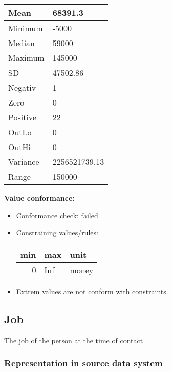 \documentclass[
]{article}
\providecommand{\tightlist}{%
  \setlength{\itemsep}{0pt}\setlength{\parskip}{0pt}}
\begin{document}
\begin{table}[H]
\centering
\begin{tabular}{l|l}
\hline
Mean & 68391.3\\
\hline
Minimum & -5000\\
\hline
Median & 59000\\
\hline
Maximum & 145000\\
\hline
SD & 47502.86\\
\hline
Negativ & 1\\
\hline
Zero & 0\\
\hline
Positive & 22\\
\hline
OutLo & 0\\
\hline
OutHi & 0\\
\hline
Variance & 2256521739.13\\
\hline
Range & 150000\\
\hline
\end{tabular}
\end{table}

\textbf{Value conformance:}

\begin{itemize}
\tightlist
\item
  Conformance check: failed
\item
  Constraining values/rules:

  \begin{table}[H]
  \centering
  \begin{tabular}{r|l|l}
  \hline
  \textbf{min} & \textbf{max} & \textbf{unit}\\
  \hline
  0 & Inf & money\\
  \hline
  \end{tabular}
  \end{table}
\item
  Extrem values are not conform with constraints.
\end{itemize}

\newpage

\hypertarget{job}{%
\subsection{Job}\label{job}}

The job of the person at the time of contact

\hypertarget{representation-in-source-data-system-8}{%
\subsubsection{\texorpdfstring{Representation in \textbf{source} data
system}{Representation in source data system}}\label{representation-in-source-data-system-8}}
\end{document}
